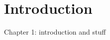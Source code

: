 \chapter[Introduction]{Introduction} \label{c:intro} \glsresetall
%
Chapter 1: introduction and stuff
